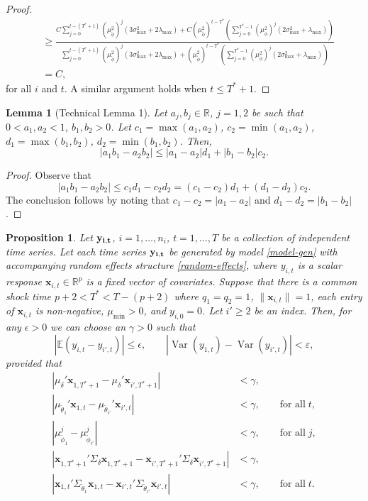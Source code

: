 \documentclass[11pt]{article}
\newcommand{\R}{\mathbb{R}}
\newcommand{\x}{\textbf{x}}
\def\E{\mathbb{E}} %
\DeclareMathOperator{\Var}{Var} %
\newtheorem{lem}{Lemma}
\newtheorem{prop}{Proposition}
\theoremstyle{definition}
\begin{document}
\begin{proof}
\begin{align*}
  &\geq \frac{C\sum_{j=0}^{t - (T^*+1)} (\mu_{\tilde\phi}^2)^j\left(3\sigma^2_{\max} + 2\lambda_{\max}\right) + C(\mu_{\tilde\phi}^2)^{t - T^*}\left(\sum_{j=0}^{T^*-1}\left(\mu_{\phi}^2\right)^{j}(2\sigma^2_{\max} + \lambda_{\max})\right)}{\sum_{j=0}^{t - (T^*+1)} (\mu_{\tilde\phi}^2)^j\left(3\sigma^2_{\max} + 2\lambda_{\max}\right) + (\mu_{\tilde\phi}^2)^{t - T^*}\left(\sum_{j=0}^{T^*-1}\left(\mu_{\phi}^2\right)^{j}(2\sigma^2_{\max} + \lambda_{\max})\right)} \\
  &= C,
\end{align*}
for all $i$ and $t$. A similar argument holds when $t \leq T^* + 1$.
\end{proof}


\begin{lem}[Technical Lemma 1] \label{lem:absdiff}
Let $a_j, b_j \in \R$, $j = 1,2$ be such that $0 < a_1,a_2 < 1$, $b_1,b_2 > 0$. Let $c_1 = \max(a_1,a_2)$, $c_2 = \min(a_1,a_2)$, $d_1 = \max(b_1,b_2)$, $d_2 = \min(b_1,b_2)$. Then, 
$$
  |a_1b_1 - a_2b_2| \leq |a_1 - a_2|d_1 + |b_1 - b_2|c_2.
$$
\end{lem}

\begin{proof}
Observe that 
$$
  |a_1b_1 - a_2b_2| \leq c_1d_1 - c_2d_2 = (c_1 - c_2)d_1 + (d_1 - d_2)c_2. 
$$
The conclusion follows by noting that $c_1 - c_2 = |a_1 - a_2|$ and $d_1 - d_2 = |b_1 - b_2|$.
\end{proof}


\begin{prop} \label{prop:donor}
  Let $\bf{y}_{i,t}$, $i = 1,\ldots,n_i$, $t = 1,\ldots, T$ be a collection of independent time series. Let each time series $\bf{y}_{i,t}$ be generated by model \eqref{model-gen} with accompanying random effects structure \eqref{random-effects}, where $y_{i,t}$ is a scalar response $\x_{i,t} \in \R^p$ is a fixed vector of covariates. Suppose that there is a common shock time $p + 2 < T^* < T - (p+2)$ where $q_1 = q_2 = 1$, $\|\x_{i,t}\| = 1$, each entry of $\x_{i,t}$ is non-negative, $\mu_{\min} > 0$, and $y_{i,0} = 0$. Let $i' \geq 2$ be an index. Then, for any $\epsilon > 0$ we can choose an $\gamma > 0$ such that 
  $$
    \left\vert\E(y_{i,t} - y_{i',t})\right\vert \leq \epsilon, \qquad |\Var(y_{1,t}) - \Var(y_{i',t})| < \varepsilon,
  $$
  provided that 
  \begin{align*}
  |\mu_\delta'\x_{1,T^*+1} - \mu_\delta'\x_{i',T^*+1}| &< \gamma, \\
  \left\vert\mu_{\tilde\theta_{1}}'\x_{1,t} - \mu_{\tilde\theta_{i'}}'\x_{i',t}\right\vert &< \gamma, \qquad \text{for all} \; t, \\
  |\mu_{\tilde\phi_1}^j - \mu_{\tilde\phi_{i'}}^j| &< \gamma, \qquad \text{for all} \; j, \\
  |\x_{1,T^*+1}'\Sigma_\delta\x_{1,T^*+1} - \x_{i',T^*+1}'\Sigma_\delta\x_{i',T^*+1}| &< \gamma, \\
  |\x_{1,t}'\Sigma_{\tilde\theta_{1}}\x_{1,t} - \x_{i',t}'\Sigma_{\tilde\theta_{i'}}\x_{i',t}| &< \gamma, \qquad \text{for all} \; t.
  \end{align*}
\end{prop}
\end{document}
